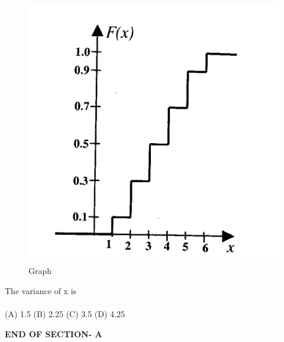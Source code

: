 \documentclass[journal,12pt,onecolumn]{IEEEtran}
\begin{document}
\begin{enumerate}[label=\textbf{Q\arabic*.},itemsep=2em]
\begin{figure}[htbp]
  \centering
  \includegraphics[width=.6\linewidth]{figs/A/fig1.png}
  \caption{Graph}
  \label{A/fig1}
\end{figure}


The variance of x is\\

\vspace{0.2cm}
\hfill{} \\
(A) 1.5 
(B) 2.25 
(C) 3.5   
(D) 4.25   

\vspace{3\baselineskip}
    \begin{center}
    \textbf{\Large END OF SECTION- A}
    \end{center}

\end{enumerate}


\newpage
\end{document}
